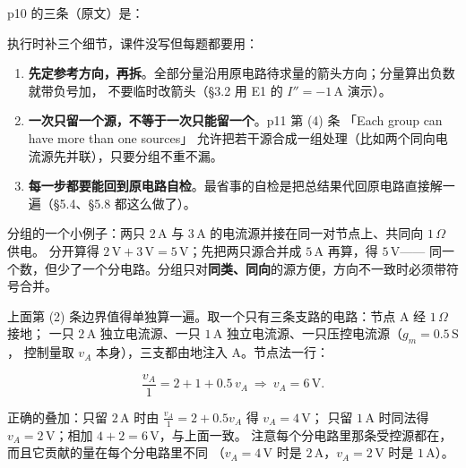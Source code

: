 \documentclass[11pt]{ctexart}
\begin{document}

p10 的三条（原文）是：

执行时补三个细节，课件没写但每题都要用：

\begin{enumerate}
\item \textbf{先定参考方向，再拆}。全部分量沿用原电路待求量的箭头方向；分量算出负数就带负号加，
      不要临时改箭头（§3.2 用 E1 的 $I''=-1\,\mathrm{A}$ 演示）。
\item \textbf{一次只留一个源，不等于一次只能留一个}。p11 第 (4) 条 「Each group can have more than one sources」
      允许把若干源合成一组处理（比如两个同向电流源先并联），只要分组不重不漏。
\item \textbf{每一步都要能回到原电路自检}。最省事的自检是把总结果代回原电路直接解一遍（§5.4、§5.8 都这么做了）。
\end{enumerate}

分组的一个小例子：两只 $2\,\mathrm{A}$ 与 $3\,\mathrm{A}$ 的电流源并接在同一对节点上、共同向 $1\,\Omega$ 供电。
分开算得 $2\,\mathrm{V}+3\,\mathrm{V}=5\,\mathrm{V}$；先把两只源合并成 $5\,\mathrm{A}$ 再算，得 $5\,\mathrm{V}$——
同一个数，但少了一个分电路。分组只对\textbf{同类、同向}的源方便，方向不一致时必须带符号合并。


上面第 (2) 条边界值得单独算一遍。取一个只有三条支路的电路：节点 A 经 $1\,\Omega$ 接地；
一只 $2\,\mathrm{A}$ 独立电流源、一只 $1\,\mathrm{A}$ 独立电流源、一只压控电流源（$g_m=0.5\,\mathrm{S}$，
控制量取 $v_A$ 本身），三支都由地注入 A。节点法一行：

\[ \frac{v_A}{1}=2+1+0.5\,v_A\ \Longrightarrow\ v_A=6\,\mathrm{V} . \]

正确的叠加：只留 $2\,\mathrm{A}$ 时由 $\frac{v_A}{1}=2+0.5v_A$ 得 $v_A=4\,\mathrm{V}$；
只留 $1\,\mathrm{A}$ 时同法得 $v_A=2\,\mathrm{V}$；相加 $4+2=6\,\mathrm{V}$，与上面一致。
注意每个分电路里那条受控源都在，而且它贡献的量在每个分电路里不同
（$v_A=4\,\mathrm{V}$ 时是 $2\,\mathrm{A}$，$v_A=2\,\mathrm{V}$ 时是 $1\,\mathrm{A}$）。
\end{document}
